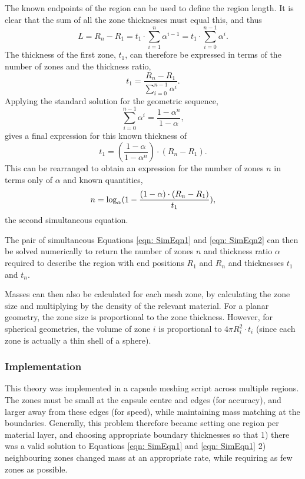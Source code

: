 The known endpoints of the region can be used to define the region length. It is clear that the sum of all the zone thicknesses must equal this, and thus
\begin{equation}{L = R_n - R_1 = t_1 \cdot \sum_{i=1}^{n} \alpha^{i-1} = t_1 \cdot \sum_{i=0}^{n-1} \alpha^{i}.}\end{equation}
The thickness of the first zone, $t_1$, can therefore be expressed in terms of the number of zones and the thickness ratio,
\begin{equation}{t_1  = \frac{R_n - R_1}{\sum_{i=0}^{n-1} \alpha^{i}}.}\end{equation}
Applying the standard solution for the geometric sequence, 
\begin{equation}{{\sum_{i=0}^{n-1} \alpha^{i}} = \frac{1 - \alpha^n}{1 - \alpha},}\end{equation}
gives a final expression for this known thickness of 
\begin{equation}{t_1  = ( \frac{1 - \alpha}{1 - \alpha^n} )\cdot (R_n - R_1).}\end{equation}
This can be rearranged to obtain an expression for the number of zones $n$ in terms only of $\alpha$ and known quantities,
\begin{equation}{\label{eqn: SimEqn2} n  =  \log_{\alpha} (1 - \frac{ (1-\alpha) \cdot(R_n - R_1)}{t_1} ), }\end{equation}
the second simultaneous equation.

The pair of simultaneous Equations \ref{eqn: SimEqn1} and \ref{eqn: SimEqn2} can then be solved numerically to return the number of zones $n$ and thickness ratio $\alpha$ required to describe the region with end positions $R_1$ and $R_n$ and thicknesses $t_1$ and $t_n$.

Masses can then also be calculated for each mesh zone, by calculating the zone size and multiplying by the density of the relevant material. For a planar geometry, the zone size is proportional to the zone thickness. However, for spherical geometries, the volume of zone $i$ is proportional to $4 \pi R_i^2 \cdot t_i$ (since each zone is actually a thin shell of a sphere).

\subsubsection{Implementation}
This theory was implemented in a capsule meshing script across multiple regions. The zones must be small at the capsule centre and edges (for accuracy), and larger away from these edges (for speed), while maintaining mass matching at the boundaries. Generally, this problem therefore became setting one region per material layer, and choosing appropriate boundary thicknesses so that 1) there was a valid solution to Equations \ref{eqn: SimEqn1} and \ref{eqn: SimEqn1} 2) neighbouring zones changed mass at an appropriate rate, while requiring as few zones as possible.

